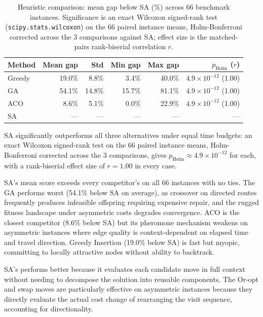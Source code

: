 \documentclass[11pt,a4paper]{article}
\begin{document}
\begin{table}[H]
\centering
\caption{Heuristic comparison: mean gap below SA (\%) across 66 benchmark instances. Significance is an exact Wilcoxon signed-rank test (\texttt{scipy.stats.wilcoxon}) on the 66 paired instance means, Holm-Bonferroni corrected across the 3 comparisons against SA; effect size is the matched-pairs rank-biserial correlation $r$.}
\label{tab:heuristic_comparison}
\begin{tabular}{lrrrrr}
\toprule
\textbf{Method} & \textbf{Mean gap} & \textbf{Std} & \textbf{Min gap} & \textbf{Max gap} & \textbf{$p_{\text{Holm}}$ ($r$)} \\
\midrule
Greedy  & 19.0\% &  8.8\% &  3.4\% & 40.0\% & $4.9\times10^{-12}$ (1.00) \\
GA      & 54.1\% & 14.8\% & 15.7\% & 81.1\% & $4.9\times10^{-12}$ (1.00) \\
ACO     &  8.6\% &  5.1\% &  0.0\% & 22.9\% & $4.9\times10^{-12}$ (1.00) \\
SA      &  ---   & ---    &  ---   & ---    & --- \\
\bottomrule
\end{tabular}
\end{table}

SA significantly outperforms all three alternatives under equal time budgets: an exact Wilcoxon signed-rank test on the 66 paired instance means, Holm-Bonferroni corrected across the 3 comparisons, gives $p_{\text{Holm}} \approx 4.9\times10^{-12}$ for each, with a rank-biserial effect size of $r = 1.00$ in every case.

SA's mean score exceeds every competitor's on all 66 instances with no ties.
The GA performs worst (54.1\% below SA on average), as crossover on directed routes frequently produces infeasible offspring requiring expensive repair, and the rugged fitness landscape under asymmetric costs degrades convergence.
ACO is the closest competitor (8.6\% below SA) but its pheromone mechanism weakens on asymmetric instances where edge quality is context-dependent on elapsed time and travel direction.
Greedy Insertion (19.0\% below SA) is fast but myopic, committing to locally attractive nodes without ability to backtrack.

SA's performs better because it evaluates each candidate move in full context without needing to decompose the solution into reusable components.
The Or-opt and swap moves are particularly effective on asymmetric instances because they directly evaluate the actual cost change of rearranging the visit sequence, accounting for directionality.
\end{document}
